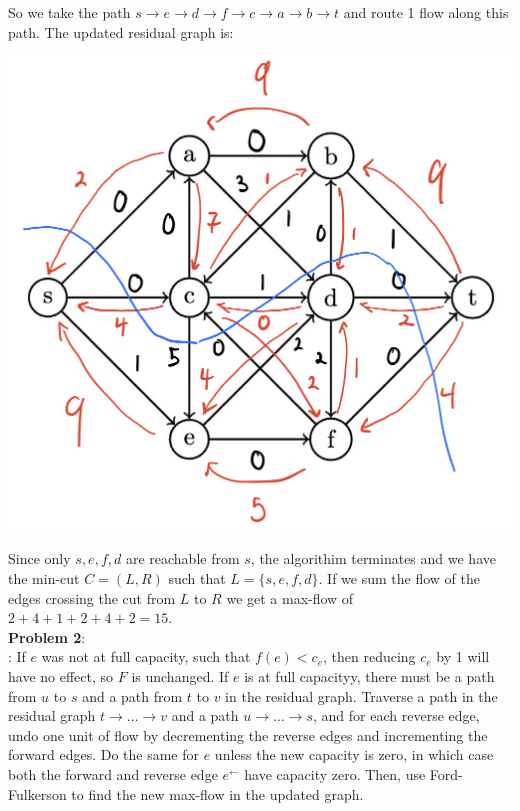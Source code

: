 \documentclass{article}
\begin{document}
So we take the path $s \rightarrow e \rightarrow d \rightarrow f \rightarrow c \rightarrow a \rightarrow b \rightarrow t$ and route 1 flow along this path. The updated residual graph is: 
\begin{center}
    \includegraphics[scale=0.2]{terminate.jpg}
\end{center}
Since only $s, e, f, d$ are reachable from $s$, the algorithim terminates and we have the min-cut $C = (L, R)$ such that $L = \{s, e, f, d\}$. If we sum the flow of the edges crossing the cut from $L$ to $R$ we get a max-flow of $2 + 4 + 1 + 2 + 4 + 2 = 15$.\\
\textbf{Problem 2}: \\[1.0ex]
: If $e$ was not at full capacity, such that $f(e) < c_e$, then reducing $c_e$ by 1 will have no effect, so $F$ is unchanged. If $e$ is at full capacityy, there must be a path from $u$ to $s$ and a path from $t$ to $v$ in the residual graph. Traverse a path in the residual graph $t \rightarrow \dots \rightarrow v$ and a path $u \rightarrow \dots \rightarrow s$, and for each reverse edge, undo one unit of flow by decrementing the reverse edges and incrementing the forward edges. Do the same for $e$ unless the new capacity is zero, in which case both the forward and reverse edge $e^{\leftarrow}$ have capacity zero. Then, use Ford-Fulkerson to find the new max-flow in the updated graph. \\[0.5ex]
\end{document}
